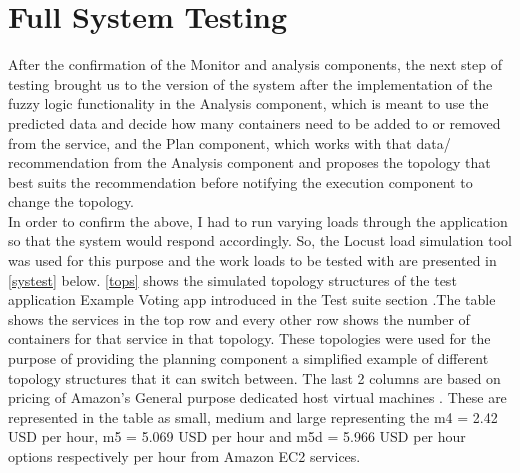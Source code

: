 \section{Full System Testing }
After the confirmation of the Monitor and analysis components, the next step of testing brought us to the version of the system after the implementation of the fuzzy logic functionality in the Analysis component, which is meant to use the predicted data and decide how many containers need to be added to or removed from the service, and the Plan component, which works with that data/ recommendation from the Analysis component and proposes the topology that best suits the recommendation before notifying the execution component to change the topology.\\
In order to confirm the above, I had to run varying loads through the application so that the system would respond accordingly. So, the Locust load simulation tool was used for this purpose and the work loads to be tested with are presented in \autoref{systest} below. \autoref{tops} shows the simulated topology structures of the test application Example Voting app introduced in the Test suite section .The table shows the services in the top row and every other row shows the number of containers for that service in that topology. These topologies were used for the purpose of providing the planning component a simplified example of different topology structures that it can switch between. The last 2 columns are based on pricing of Amazon's General purpose dedicated host virtual machines \cite{amazonprices}. These are represented in the table as small, medium and large representing the m4 = 2.42 USD per hour, m5 = 5.069 USD per hour and m5d = 5.966 USD per hour options respectively per hour from Amazon EC2 services.

\begin{table}[H]
\caption{Topology options for the testing of the application}
\label{tops}
\end{table}

